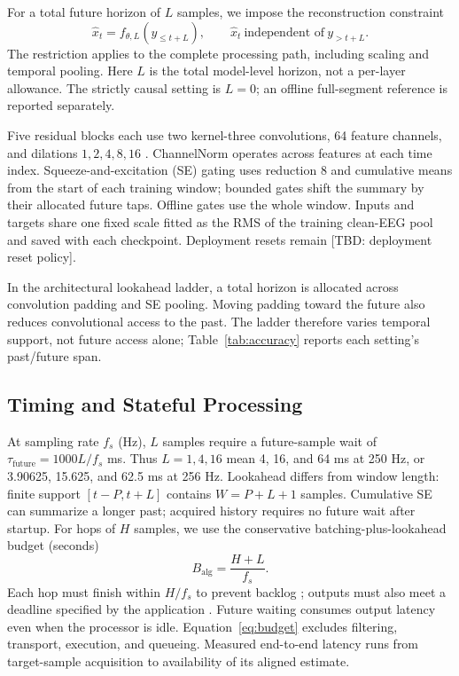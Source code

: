 \documentclass[letterpaper,journal]{IEEEtran}
\newcommand{\TBD}[1]{\textcolor{blue!65!black}{\textnormal{[TBD: #1]}}}
\begin{document}
For a total future horizon of $L$ samples, we impose the reconstruction constraint
\begin{equation}
 \hat{x}_t=f_{\theta,L}(y_{\leq t+L}),\qquad
 \hat{x}_t\ \text{independent of}\ y_{>t+L}.
 \label{eq:contract}
\end{equation}
The restriction applies to the complete processing path, including scaling and temporal pooling. Here $L$ is the total model-level horizon, not a per-layer allowance. The strictly causal setting is $L=0$; an offline full-segment reference is reported separately.

Five residual blocks each use two kernel-three convolutions, 64 feature channels, and dilations $1,2,4,8,16$ \cite{bai2018empirical,oord2016wavenet,he2016deep}. ChannelNorm operates across features at each time index. Squeeze-and-excitation (SE) gating \cite{hu2018squeeze} uses reduction 8 and cumulative means from the start of each training window; bounded gates shift the summary by their allocated future taps. Offline gates use the whole window. Inputs and targets share one fixed scale fitted as the RMS of the training clean-EEG pool and saved with each checkpoint. Deployment resets remain \TBD{deployment reset policy}.

In the architectural lookahead ladder, a total horizon is allocated across convolution padding and SE pooling. Moving padding toward the future also reduces convolutional access to the past. The ladder therefore varies temporal support, not future access alone; Table~\ref{tab:accuracy} reports each setting's past/future span.

\subsection{Timing and Stateful Processing}
At sampling rate $f_s$ (Hz), $L$ samples require a future-sample wait of $\tau_{\mathrm{future}}=1000L/f_s$ ms. Thus $L=1,4,16$ mean 4, 16, and 64 ms at 250 Hz, or 3.90625, 15.625, and 62.5 ms at 256 Hz. Lookahead differs from window length: finite support $[t-P,t+L]$ contains $W=P+L+1$ samples. Cumulative SE can summarize a longer past; acquired history requires no future wait after startup. For hops of $H$ samples, we use the conservative batching-plus-lookahead budget (seconds)
\begin{equation}
 B_{\mathrm{alg}}=\frac{H+L}{f_s}.
 \label{eq:budget}
\end{equation}
Each hop must finish within $H/f_s$ to prevent backlog \cite{bci2000timing}; outputs must also meet a deadline specified by the application \cite{wilson2010latencies}. Future waiting consumes output latency even when the processor is idle. Equation~\eqref{eq:budget} excludes filtering, transport, execution, and queueing. Measured end-to-end latency runs from target-sample acquisition to availability of its aligned estimate.
\end{document}
